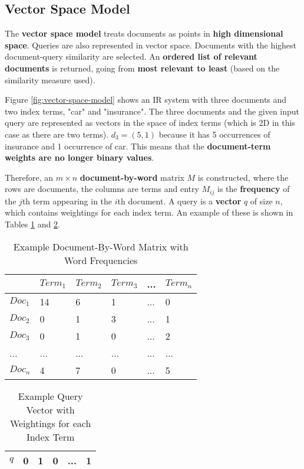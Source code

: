 \documentclass{article}
\begin{document}
\subsection{Vector Space Model}

The \textbf{vector space model} treats documents as points in \textbf{high dimensional space}. Queries are also represented in vector space. Documents with the highest document-query similarity are selected. An \textbf{ordered list of relevant documents} is returned, going from \textbf{most relevant to least} (based on the similarity measure used).

Figure \ref{fig:vector-space-model} shows an IR system with three documents and two index terms, "car" and "insurance". The three documents and the given input query are represented as vectors in the space of index terms (which is 2D in this case as there are two terms). $d_3 = (5, 1)$ because it has 5 occurrences of insurance and 1 occurrence of car. This means that the \textbf{document-term weights are no longer binary values}.

Therefore, an $m \times n$ \textbf{document-by-word} matrix $M$ is constructed, where the rows are documents, the columns are terms and entry $M_{ij}$ is the \textbf{frequency} of the $j$th term appearing in the $i$th document. A query is a \textbf{vector} $q$ of size $n$, which contains weightings for each index term. An example of these is shown in Tables \ref{tab:doc-by-word-vector-space} and \ref{tab:query-vector-space}.

\begin{table}[H]
	\centering
	\begin{tabular}{|p{1cm}|p{1cm}p{1cm}p{1cm}p{1cm}p{1cm}|}
	\hline
	& $Term_1$ & $Term_2$ & $Term_3$ & ... & $Term_n$ \\
	\hline
	$Doc_1$ & 14 & 6 & 1 & ... & 0 \\
	$Doc_2$ & 0 & 1 & 3 & ... & 1 \\
	$Doc_3$ & 0 & 1 & 0 & ... & 2 \\
	... & ... & ... & ... & ... & ... \\
	$Doc_n$ & 4 & 7 & 0 & ... & 5 \\
	\hline
	\end{tabular}
	\caption{Example Document-By-Word Matrix with Word Frequencies}
	\label{tab:doc-by-word-vector-space}
\end{table}

\begin{table}[H]
	\centering
	\begin{tabular}{|p{1cm}|p{1cm}p{1cm}p{1cm}p{1cm}p{1cm}|}
	\hline
	$q$ & 0 & 1 & 0 & ... & 1 \\
	\hline
	\end{tabular}
	\caption{Example Query Vector with Weightings for each Index Term}
	\label{tab:query-vector-space}
\end{table}
\end{document}
